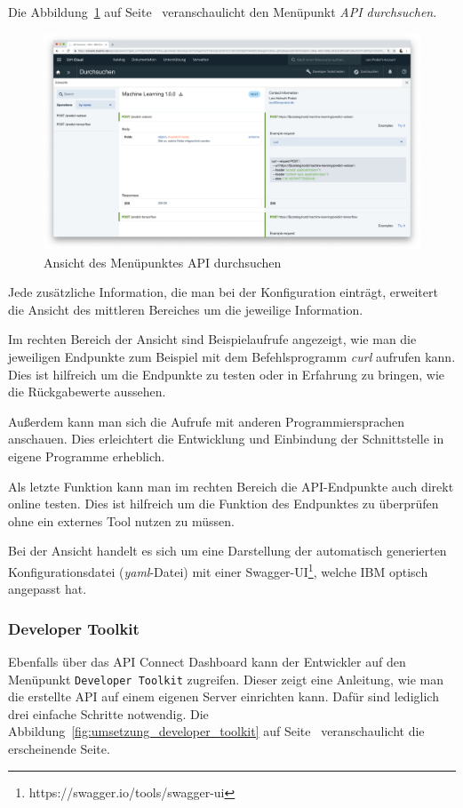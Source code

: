 Die Abbildung~\ref{fig:umsetzung_apiconnect_durchsuchen} auf Seite~\pageref{fig:umsetzung_apiconnect_durchsuchen}
veranschaulicht den Menüpunkt \textit{API durchsuchen}.

\begin{figure}[h]
    \centering
    \includegraphics[width=\textwidth]{images/kapitel_3/apiconnect_durchsuchen.png}
    \caption{Ansicht des Menüpunktes API durchsuchen}
    \label{fig:umsetzung_apiconnect_durchsuchen}
\end{figure}

Jede zusätzliche Information, die man bei der Konfiguration einträgt, erweitert die Ansicht des mittleren Bereiches
um die jeweilige Information.

Im rechten Bereich der Ansicht sind Beispielaufrufe angezeigt, wie man die jeweiligen Endpunkte zum Beispiel mit dem
Befehlsprogramm \textit{curl} aufrufen kann. Dies ist hilfreich um die Endpunkte zu testen oder in Erfahrung zu bringen,
wie die Rückgabewerte aussehen.

Außerdem kann man sich die Aufrufe mit anderen Programmiersprachen anschauen. Dies erleichtert die Entwicklung und
Einbindung der Schnittstelle in eigene Programme erheblich.

Als letzte Funktion kann man im rechten Bereich die API-Endpunkte auch direkt online testen. Dies ist hilfreich um die
Funktion des Endpunktes zu überprüfen ohne ein externes Tool nutzen zu müssen.

Bei der Ansicht handelt es sich um eine Darstellung der automatisch generierten Konfigurationsdatei
(\textit{yaml}-Datei) mit einer Swagger-UI\footnote{https://swagger.io/tools/swagger-ui}, welche IBM optisch angepasst
hat.

\subsubsection{Developer Toolkit}
Ebenfalls über das API Connect Dashboard kann der Entwickler auf den Menüpunkt \texttt{Developer Toolkit} zugreifen.
Dieser zeigt eine Anleitung, wie man die erstellte API auf einem eigenen Server einrichten kann. Dafür sind lediglich
drei einfache Schritte notwendig. Die Abbildung~\ref{fig:umsetzung_developer_toolkit} auf
Seite~\pageref{fig:umsetzung_developer_toolkit} veranschaulicht die erscheinende Seite.

